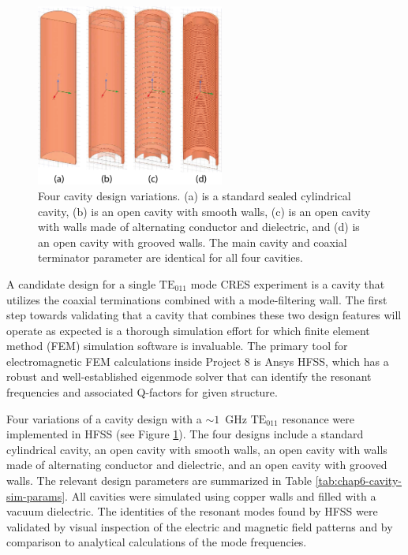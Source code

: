 \begin{figure}[htbp]
    \centering
    \includegraphics*[width=0.55\textwidth]{figs/Chapter-6/230610_cavity_variations.png}
    \caption{\label{fig:chap6-cavity-variations} Four cavity design variations. (a) is a standard sealed cylindrical cavity, (b) is an open cavity with smooth walls, (c) is an open cavity with walls made of alternating conductor and dielectric, and (d) is an open cavity with grooved walls. The main cavity and coaxial terminator parameter are identical for all four cavities.}
\end{figure}

A candidate design for a single $\mathrm{TE}_{011}$ mode CRES experiment is a cavity that utilizes the coaxial terminations combined with a mode-filtering wall. The first step towards validating that a cavity that combines these two design features will operate as expected is a thorough simulation effort for which finite element method (FEM) simulation software is invaluable. The primary tool for electromagnetic FEM calculations inside Project 8 is Ansys HFSS, which has a robust and well-established eigenmode solver that can identify the resonant frequencies and associated Q-factors for given structure. 

Four variations of a cavity design with a $\sim 1$~GHz $\mathrm{TE}_{011}$ resonance were implemented in HFSS (see Figure \ref{fig:chap6-cavity-variations}). The four designs include a standard cylindrical cavity, an open cavity with smooth walls, an open cavity with walls made of alternating conductor and dielectric, and an open cavity with grooved walls. The relevant design parameters are summarized in Table \ref{tab:chap6-cavity-sim-params}. All cavities were simulated using copper walls and filled with a vacuum dielectric. The identities of the resonant modes found by HFSS were validated by visual inspection of the electric and magnetic field patterns and by comparison to analytical calculations of the mode frequencies.

